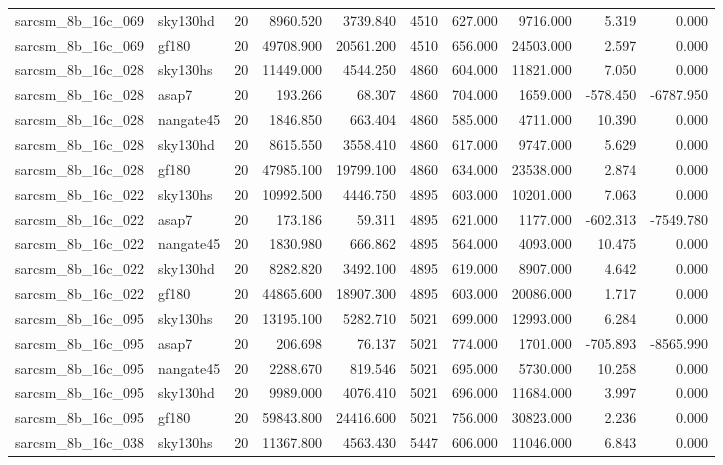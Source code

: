 \begin{tabular}{llrrrrrrrr}
sarcsm\_8b\_16c\_069 & sky130hd & 20 & 8960.520 & 3739.840 & 4510 & 627.000 & 9716.000 & 5.319 & 0.000 \\
sarcsm\_8b\_16c\_069 & gf180 & 20 & 49708.900 & 20561.200 & 4510 & 656.000 & 24503.000 & 2.597 & 0.000 \\
sarcsm\_8b\_16c\_028 & sky130hs & 20 & 11449.000 & 4544.250 & 4860 & 604.000 & 11821.000 & 7.050 & 0.000 \\
sarcsm\_8b\_16c\_028 & asap7 & 20 & 193.266 & 68.307 & 4860 & 704.000 & 1659.000 & -578.450 & -6787.950 \\
sarcsm\_8b\_16c\_028 & nangate45 & 20 & 1846.850 & 663.404 & 4860 & 585.000 & 4711.000 & 10.390 & 0.000 \\
sarcsm\_8b\_16c\_028 & sky130hd & 20 & 8615.550 & 3558.410 & 4860 & 617.000 & 9747.000 & 5.629 & 0.000 \\
sarcsm\_8b\_16c\_028 & gf180 & 20 & 47985.100 & 19799.100 & 4860 & 634.000 & 23538.000 & 2.874 & 0.000 \\
sarcsm\_8b\_16c\_022 & sky130hs & 20 & 10992.500 & 4446.750 & 4895 & 603.000 & 10201.000 & 7.063 & 0.000 \\
sarcsm\_8b\_16c\_022 & asap7 & 20 & 173.186 & 59.311 & 4895 & 621.000 & 1177.000 & -602.313 & -7549.780 \\
sarcsm\_8b\_16c\_022 & nangate45 & 20 & 1830.980 & 666.862 & 4895 & 564.000 & 4093.000 & 10.475 & 0.000 \\
sarcsm\_8b\_16c\_022 & sky130hd & 20 & 8282.820 & 3492.100 & 4895 & 619.000 & 8907.000 & 4.642 & 0.000 \\
sarcsm\_8b\_16c\_022 & gf180 & 20 & 44865.600 & 18907.300 & 4895 & 603.000 & 20086.000 & 1.717 & 0.000 \\
sarcsm\_8b\_16c\_095 & sky130hs & 20 & 13195.100 & 5282.710 & 5021 & 699.000 & 12993.000 & 6.284 & 0.000 \\
sarcsm\_8b\_16c\_095 & asap7 & 20 & 206.698 & 76.137 & 5021 & 774.000 & 1701.000 & -705.893 & -8565.990 \\
sarcsm\_8b\_16c\_095 & nangate45 & 20 & 2288.670 & 819.546 & 5021 & 695.000 & 5730.000 & 10.258 & 0.000 \\
sarcsm\_8b\_16c\_095 & sky130hd & 20 & 9989.000 & 4076.410 & 5021 & 696.000 & 11684.000 & 3.997 & 0.000 \\
sarcsm\_8b\_16c\_095 & gf180 & 20 & 59843.800 & 24416.600 & 5021 & 756.000 & 30823.000 & 2.236 & 0.000 \\
sarcsm\_8b\_16c\_038 & sky130hs & 20 & 11367.800 & 4563.430 & 5447 & 606.000 & 11046.000 & 6.843 & 0.000 \\

\end{tabular}
